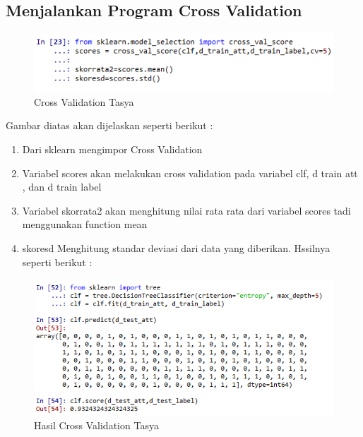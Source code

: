 \subsection{ Menjalankan Program Cross Validation}
\begin{figure}[ht]
\centering
\includegraphics[scale=0.5]{figures/praktektasya5.png}
\caption{Cross Validation Tasya}
\label{Aplikasi Pandas}
\end{figure}
Gambar diatas akan dijelaskan seperti berikut :
\begin{enumerate}
\item Dari sklearn mengimpor Cross Validation
\item Variabel scores akan melakukan cross validation pada variabel clf, d train att , dan d train label
\item Variabel skorrata2 akan menghitung nilai rata rata dari variabel scores tadi menggunakan function mean
\item skoresd Menghitung standar deviasi dari data yang diberikan. Hssilnya seperti berikut :
\end{enumerate}
\begin{figure}[ht]
\centering
\includegraphics[scale=0.5]{figures/praktektasya6.png}
\caption{Hasil Cross Validation Tasya}
\label{Cross Validation}
\end{figure}

